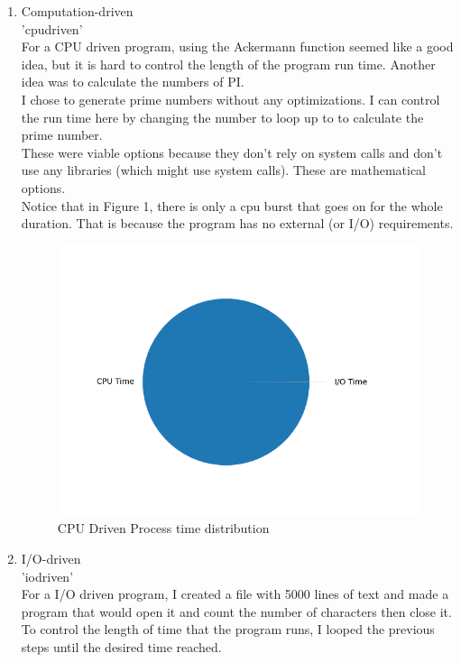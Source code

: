 \documentclass[11pt]{article}
\begin{document}
\begin{enumerate}
\item Computation-driven\\
'cpudriven'\\
For a CPU driven program, using the Ackermann function seemed like a good idea, but it is hard to control the length of the program run time. Another idea was to calculate the numbers of PI.\\

I chose to generate prime numbers without any optimizations. I can control the run time here by changing the number to loop up to to calculate the prime number.\\

These were viable options because they don't rely on system calls and don't use any libraries (which might use system calls). These are mathematical options.\\

Notice that in Figure 1, there is only a cpu burst that goes on for the whole duration. That is because the program has no external (or I/O) requirements.\\

\begin{figure}[htbp]
\centering
\includegraphics[width=.9\linewidth]{./CPUTimeDist.png}
\caption{CPU Driven Process time distribution}
\end{figure}

\item I/O-driven\\
'iodriven'\\
For a I/O driven program, I created a file with 5000 lines of text and made a program that would open it and count the number of characters then close it. To control the length of time that the program runs, I looped the previous steps until the desired time reached.\\


\end{enumerate}
\end{document}
